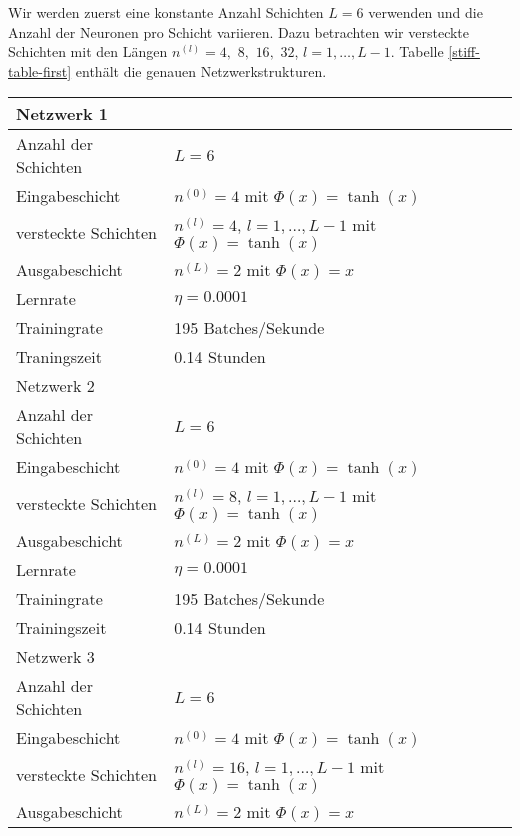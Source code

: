 Wir werden zuerst eine konstante Anzahl Schichten $L=6$ verwenden und die Anzahl der Neuronen pro Schicht variieren.
Dazu betrachten wir versteckte Schichten mit den Längen
$n^{(l)} = 4,$ $8,$ $16,$ $32$, $l = 1, \dots, L-1$. Tabelle \ref{stiff-table-first} enthält die genauen
Netzwerkstrukturen.
\begin{table}
       \renewcommand{\arraystretch}{1.0}
       \centering
       \begin{tabular}{ l | l }
              \hline
              Netzwerk 1 & \\
              \hline
              Anzahl der Schichten & $L=6$ \\
              Eingabeschicht & $n^{(0)}=4$ mit $\Phi(x)=\tanh(x)$ \\
              versteckte Schichten & $n^{(l)}=4$, $l = 1, \dots, L-1$ mit $\Phi(x)=\tanh(x)$ \\
              Ausgabeschicht & $n^{(L)}=2$ mit $\Phi(x)=x$ \\
              Lernrate & $\eta=0.0001$ \\
              Trainingrate & 195 Batches/Sekunde \\
              Traningszeit & 0.14 Stunden \\
              \hline
              Netzwerk 2 & \\
              \hline
              Anzahl der Schichten & $L=6$ \\
              Eingabeschicht & $n^{(0)}=4$ mit $\Phi(x)=\tanh(x)$ \\
              versteckte Schichten & $n^{(l)}=8$, $l = 1, \dots, L-1$ mit $\Phi(x)=\tanh(x)$ \\
              Ausgabeschicht & $n^{(L)}=2$ mit $\Phi(x)=x$ \\
              Lernrate & $\eta=0.0001$ \\
              Trainingrate & 195 Batches/Sekunde \\
              Trainingszeit & 0.14 Stunden \\
              \hline
              Netzwerk 3 & \\
              \hline
              Anzahl der Schichten & $L=6$ \\
              Eingabeschicht & $n^{(0)}=4$ mit $\Phi(x)=\tanh(x)$ \\
              versteckte Schichten & $n^{(l)}=16$, $l = 1, \dots, L-1$ mit $\Phi(x)=\tanh(x)$ \\
              Ausgabeschicht & $n^{(L)}=2$ mit $\Phi(x)=x$ \\

\end{tabular}
\end{table}
